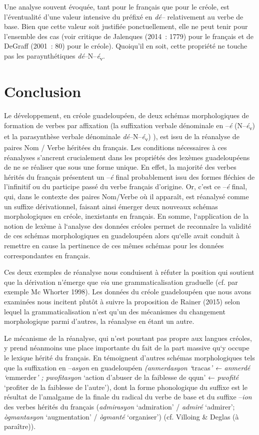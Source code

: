 \documentclass[output=paper]{langsci/langscibook}
\begin{document}
Une analyse souvent évoquée, tant pour le français que pour le créole,
est l'éventualité d'une valeur intensive du préfixé en \emph{dé--}
relativement au verbe de base. Bien que cette valeur soit justifiée
ponctuellement, elle ne peut tenir pour l'ensemble des cas (voir
critique de Jalenques (2014~: 1779) pour le français et de DeGraff
(2001~: 80) pour le créole). Quoiqu'il en soit, cette propriété ne touche
pas les paraynthétiques \emph{dé}--N--\emph{é}\textsubscript{v}.

\section{Conclusion }\label{section:VilloingDeglas:conclusion}

Le développement, en créole guadeloupéen, de deux schémas morphologiques
de formation de verbes par affixation (la suffixation verbale dénominale
en --\emph{é} (N--\emph{é}\textsubscript{v}) et la parasynthèse verbale
dénominale \emph{dé}--N--\emph{é}\textsubscript{v}) ), est issu de la réanalyse de
paires Nom / Verbe héritées du français. Les conditions nécessaires à
ces réanalyses s'ancrent crucialement dans les propriétés des lexèmes
guadeloupéens de ne se réaliser que sous une forme unique. En effet, la
majorité des verbes hérités du français présentent un --\emph{é }final
probablement issu des formes fléchies de l'infinitif ou du participe
passé du verbe français d'origine. Or, c'est ce --\emph{é} final, qui,
dans le contexte des paires Nom/Verbe où il apparaît, est réanalysé
comme un suffixe dérivationnel, faisant ainsi émerger deux nouveaux
schémas morphologiques en créole, inexistants en français. En somme,
l`application de la notion de lexème à l`analyse des données créoles
permet de reconnaîre la validité de ces schémas morphologiques en
guadeloupéen alors qu`elle avait conduit à remettre en cause la
pertinence de ces mêmes schémas pour les données correspondantes en
français.

Ces deux exemples de réanalyse nous conduisent à réfuter la position qui
soutient que la dérivation n'émerge que \emph{via} une
grammaticalisation graduelle (cf. par exemple Mc Whorter 1998). Les
données du créole guadeloupéen que nous avons examinées nous incitent
plutôt à suivre la proposition de Rainer (2015) selon lequel la
grammaticalisation n'est qu'un des mécanismes du changement
morphologique parmi d'autres, la réanalyse en étant un autre.

Le mécanisme de la réanalyse, qui n'est pourtant pas propre aux langues
créoles, y prend néanmoins une place importante du fait de la part
massive qu`y occupe le lexique hérité du français. En témoignent
d'autres schémas morphologiques tels que la suffixation en
--\emph{asyon} en guadeloupéen \emph{(anmerdasyon `}tracas\emph{' ←
anmerdé `}emmerder\emph{' ; pwofitasyon} `action d'abuser de la
faiblesse de qqun' ← \emph{pwofité} `profiter de la faiblesse de
l'autre'), dont la forme phonologique du suffixe est le résultat de
l'amalgame de la finale du radical du verbe de base et du suffixe
--\emph{ion} des verbes hérités du français (\emph{admirasyon}
`admiration' / \emph{admiré} `admirer'; \emph{ògmantasyon}
`augmentation' / \emph{ògmanté} `organiser') (cf. Villoing \& Deglas (à
paraître)).
\end{document}
